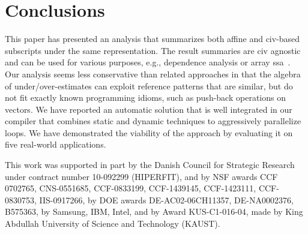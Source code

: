 \documentclass[10pt,nocopyrightspace]{sigplanconf}
\begin{document}

\section{Conclusions}
\label{sec:Concl}

This paper has presented an analysis that summarizes both 
affine and {\sc civ}-based subscripts under the same 
representation. 
%
The result summaries are {\sc civ} agnostic and can be used for 
various  purposes, e.g., dependence analysis or array {\sc ssa}~\cite{arraySSA}. 
%
Our analysis seems less conservative than related approaches 
in that the algebra of under/over-estimates can exploit 
reference patterns that are similar, but do not fit exactly 
known programming idioms, such as push-back operations on
vectors. 
%
We have reported an automatic solution that is well integrated 
in our compiler that combines static and dynamic 
techniques to aggressively parallelize loops. We have 
demonstrated the viability of the approach by evaluating
it on five real-world applications.

   

\acks 
   
This work was supported in part by
the Danish Council for Strategic Research under contract number 10-092299 (HIPERFIT), 
and by 
NSF awards
CCF 0702765, %
CNS-0551685, %
CCF-0833199, %
CCF-1439145, %
CCF-1423111, %
CCF-0830753, %
IIS-0917266, %
by DOE awards
DE-AC02-06CH11357, %
DE-NA0002376, %
B575363,  %
by Samsung, IBM, Intel, and
by Award KUS-C1-016-04, made by King Abdullah University of Science and Technology (KAUST).







\end{document}
